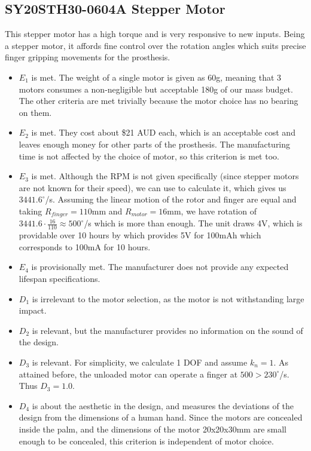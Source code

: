 \documentclass[12pt,3p]{report}
\begin{document}
\begin{multicols}{2}
\begin{itemize}
		\end{itemize}
		
		\subsection{SY20STH30-0604A Stepper Motor}

		This stepper motor has a high torque and is very responsive to new inputs. Being a stepper motor, it affords fine control
		over the rotation angles which suits precise finger gripping movements for the prosthesis.

		\begin{itemize}
		    \item[\checkmark] $E_1$ is met. The weight of a single motor is given as 60g, meaning that 3 motors consumes a non-negligible but acceptable 180g of our mass budget. The other criteria are met trivially because the motor choice has no bearing on them.
		    \item[\checkmark] $E_2$ is met. They cost about \$21 AUD each, which is an acceptable cost and leaves enough money for other parts of the prosthesis. The manufacturing time is not affected by the choice of motor, so this criterion is met too.
		    \item[\checkmark] $E_3$ is met. Although the RPM is not given specifically (since stepper motors are not known for their speed), we can use \cite{stepcalc} to calculate it, which gives us $3441.6^\circ$/s. Assuming the linear motion of the rotor and finger are equal and taking $R_{finger} = 110$mm and $R_{motor} = 16$mm, we have rotation of $3441.6\cdot\frac{16}{110} \approx 500^\circ$/s which is more than enough. The unit draws 4V, which is providable over 10 hours by \cite{coreelectronics} which provides 5V for 100mAh which corresponds to 100mA for 10 hours. 
		    \item[\checkmark] $E_4$ is provisionally met. The manufacturer does not provide any expected lifespan specifications.
		    \item $D_1$ is irrelevant to the motor selection, as the motor is not withstanding large impact.
		    \item $D_2$ is relevant, but the manufacturer provides no information on the sound of the design.
		    \item $D_3$ is relevant. For simplicity, we calculate 1 DOF and assume $k_n = 1$. As attained before, the unloaded motor can operate a finger at $500 > 230^\circ$/s. Thus $D_3 = 1.0$.
		    \item $D_4$ is about the aesthetic in the design, and measures the deviations of the design from the dimensions of a
		    human hand. Since the motors are concealed inside the palm, and the dimensions of the motor 20x20x30mm are small enough to be concealed, this criterion is independent of motor choice.
		 \end{itemize}

\end{multicols}
\end{document}
